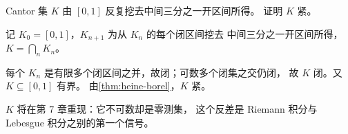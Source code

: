 \begin{exercise}[延伸]
  \label{exr:cantor-compact}
  Cantor 集 \(K\) 由 \([0,1]\) 反复挖去中间三分之一开区间所得。
  证明 \(K\) 紧。
  \begin{solution}
    记 \(K_{0}=[0,1]\)，\(K_{n+1}\) 为从 \(K_{n}\) 的每个闭区间挖去
    中间三分之一开区间所得，\(K = \bigcap_{n} K_{n}\)。

    每个 \(K_{n}\) 是有限多个闭区间之并，故闭；可数多个闭集之交仍闭，
    故 \(K\) 闭。又 \(K \subseteq [0,1]\) 有界。
    由\cref{thm:heine-borel}，\(K\) 紧。

    \(K\) 将在第 7 章重现：它不可数却是零测集，
    这个反差是 Riemann 积分与 Lebesgue 积分之别的第一个信号。
  \end{solution}
\end{exercise}

